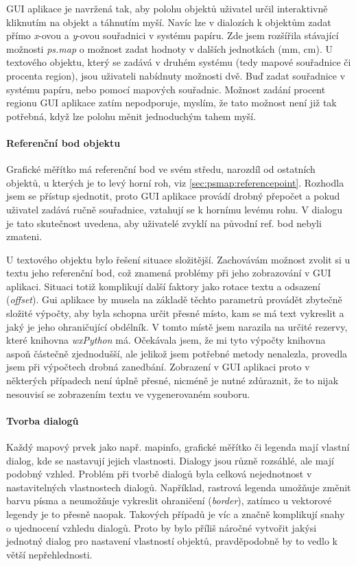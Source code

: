 \documentclass[a4paper,12pt,draft]{article}
\newcommand{\modul}[1]{\emph{#1}}
\begin{document}
 GUI aplikace je navržená tak, aby polohu objektů uživatel určil interaktivně kliknutím na objekt a táhnutím myší. Navíc lze v dialozích k objektům zadat přímo \emph{x}-ovou a \emph{y}-ovou souřadnici v systému papíru. Zde jsem rozšířila stávající možnosti \modul{ps.map} o možnost zadat hodnoty v dalších jednotkách (mm, cm).  U textového objektu, který se zadává v druhém systému (tedy mapové souřadnice či procenta region), jsou uživateli nabídnuty možnosti dvě. Buď zadat souřadnice v systému papíru, nebo pomocí mapových souřadnic. Možnost zadání procent regionu GUI aplikace zatím nepodporuje, myslím, že tato možnost není již tak potřebná, když lze polohu měnit jednoduchým tahem myší. 
 
 \paragraph*{Referenční bod objektu} 
 Grafické měřítko má referenční bod ve svém středu, narozdíl od ostatních objektů, u kterých je to levý horní roh, viz \ref{sec:psmap:referencepoint}. Rozhodla jsem se přístup sjednotit, proto GUI aplikace provádí drobný přepočet a pokud uživatel zadává ručně souřadnice, vztahují se k hornímu levému rohu. V dialogu je tato skutečnost uvedena, aby uživatelé zvyklí na původní ref. bod nebyli zmateni.
 
 U textového objektu bylo řešení situace složitější. Zachovávám možnost zvolit si u textu jeho referenční bod, což znamená problémy při jeho zobrazování v GUI aplikaci. Situaci totiž komplikují další faktory jako rotace textu a odsazení (\emph{offset}).
 Gui aplikace by musela na základě těchto parametrů provádět zbytečně složité výpočty, aby byla schopna určit přesné místo, kam se má text vykreslit a jaký je jeho ohraničující obdélník. V tomto místě jsem narazila na určité rezervy, které knihovna \emph{wxPython} má. Očekávala jsem, že mi tyto výpočty knihovna aspoň částečně zjednodušší, ale jelikož jsem potřebné metody nenalezla, provedla jsem při výpočtech drobná zanedbání. Zobrazení v GUI aplikaci proto v některých případech není úplně přesné, nicméně je nutné zdůraznit, že to nijak nesouvisí se zobrazením textu ve  vygenerovaném souboru.
 
 \paragraph*{Tvorba dialogů}
 Každý mapový prvek jako např. mapinfo, grafické měřítko či legenda mají vlastní dialog, kde se nastavují jejich vlastnosti. Dialogy jsou různě rozsáhlé, ale mají podobný vzhled. Problém při tvorbě dialogů byla celková nejednotnost v nastavitelných vlastnostech dialogů. Například, rastrová legenda umožňuje změnit barvu písma a neumožňuje vykreslit ohraničení (\emph{border}), zatímco u vektorové legendy je to přesně naopak. Takových případů je víc a značně komplikují snahy o ujednocení vzhledu dialogů. Proto by bylo příliš náročné vytvořit jakýsi jednotný dialog pro nastavení vlastností objektů, pravděpodobně by to vedlo k větší nepřehlednosti. 
 
\end{document}
